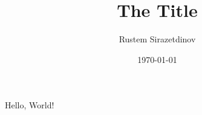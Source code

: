 \documentclass[a4paper,12pt]{report}
\title{The \huge{Title}}
\author{Rustem Sirazetdinov}
\date{\today}
\begin{document}
\maketitle

Hello, World!
\end{document}
